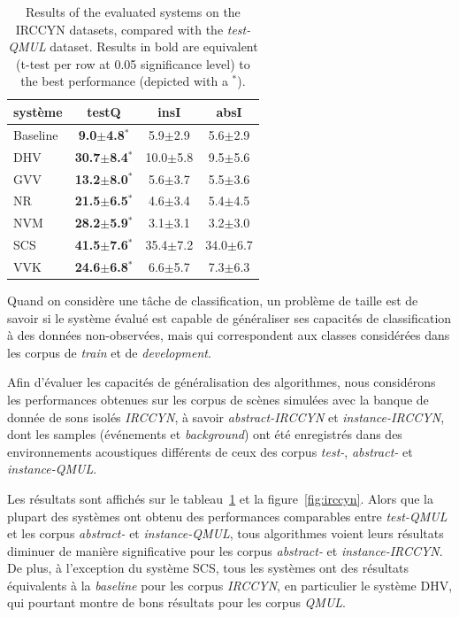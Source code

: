 \begin{table}
\begin{center} 
\begin{tabular}{lccc}
système  & testQ & insI & absI \\ 
\hline 
Baseline & \textbf{9.0$\pm$4.8$^*$}  &  5.9$\pm$2.9 &  5.6$\pm$2.9 \\ 
DHV      & \textbf{30.7$\pm$8.4$^*$} & 10.0$\pm$5.8 &  9.5$\pm$5.6 \\ 
GVV      & \textbf{13.2$\pm$8.0$^*$} &  5.6$\pm$3.7 &  5.5$\pm$3.6 \\
NR       & \textbf{21.5$\pm$6.5$^*$} &  4.6$\pm$3.4 &  5.4$\pm$4.5 \\ 
NVM      & \textbf{28.2$\pm$5.9$^*$} &  3.1$\pm$3.1 &  3.2$\pm$3.0 \\ 
SCS      & \textbf{41.5$\pm$7.6$^*$} & 35.4$\pm$7.2 & 34.0$\pm$6.7 \\ 
VVK      & \textbf{24.6$\pm$6.8$^*$} &  6.6$\pm$5.7 &  7.3$\pm$6.3 \\ 
\hline
\end{tabular} 
\end{center}  
\caption{Results of the evaluated systems on the IRCCYN datasets, compared with the \emph{test-QMUL} dataset. Results in bold are equivalent (t-test per row at 0.05 significance level) to the best performance (depicted with a $^*$).}
\label{tab:irccyn} 
\end{table} 

Quand on considère une tâche de classification, un problème de taille est de savoir si le système évalué est capable de généraliser ses  capacités de classification à des données non-observées, mais qui correspondent aux classes considérées dans les corpus de \emph{train} et de \emph{development}.

Afin d'évaluer les capacités de généralisation des algorithmes, nous considérons les performances obtenues sur les corpus de scènes simulées avec la banque de donnée de sons isolés \emph{IRCCYN}, à savoir \emph{abstract-IRCCYN} et \emph{instance-IRCCYN}, dont les samples (événements et \emph{background}) ont été enregistrés dans des environnements acoustiques différents de ceux des corpus \emph{test-},  \emph{abstract-} et \emph{instance-QMUL}.

Les résultats sont affichés sur le tableau~\ref{tab:irccyn} et la figure~\ref{fig:irccyn}. Alors que la plupart des systèmes ont obtenu des performances comparables entre \emph{test-QMUL} et les corpus \emph{abstract-} et \emph{instance-QMUL}, tous algorithmes voient leurs résultats diminuer de manière significative pour les corpus  \emph{abstract-} et \emph{instance-IRCCYN}. De plus, à l'exception du système SCS, tous les systèmes ont des résultats équivalents à la \emph{baseline} pour les corpus \emph{IRCCYN}, en particulier le système DHV, qui pourtant montre de bons résultats pour les corpus \emph{QMUL}.

